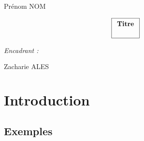 \documentclass[12pt]{report}
\begin{document}
\pagestyle{fancyplain}
\renewcommand{\chaptermark}[1]{\markboth{\chaptername\ \thechapter. #1}{}}
\renewcommand{\sectionmark}[1]{\markright{\thesection. #1}}
\lhead[]{\fancyplain{}{\bfseries\leftmark}}
\rhead[]{\fancyplain{}{\bfseries\thepage}}
\cfoot{}

\makeatletter
\def\figurename{{\protect\sc \protect\small\bfseries Fig.}}
\def\f@ffrench{\protect\figurename\space{\protect\small\bf \thefigure}\space}
\let\fnum@figure\f@ffrench%
\let\captionORI\caption
\def\caption#1{\captionORI{\rm\small #1}}
\makeatother

\graphicspath{{img/}}

\thispagestyle{empty}
{\Large
\begin{center}
Prénom NOM
\vskip1cm


$$\fbox{$
  \begin{array}{c}
  \textbf{Titre}
  \vphantom{\int_\int}
  \end{array}
  $}
$$
\end{center}
\vskip8cm

\begin{flushright}
\textit{Encadrant :}

Zacharie ALES
\end{flushright}
}

\clearpage

\renewcommand{\baselinestretch}{1.30}\small \normalsize

\tableofcontents

\renewcommand{\baselinestretch}{1.18}\small \normalsize


\chapter{Introduction}

\section{Exemples}
\end{document}
